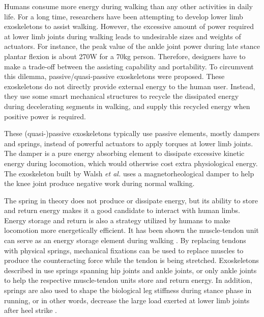 \documentclass[twocolumn,cleanfoot,10pt]{asme2ej}
\begin{document}
Humans consume more energy during walking than any other activities in daily life.
For a long time, researchers have been attempting to develop lower limb exoskeletons to assist walking.
However, the excessive amount of power required at lower limb joints during walking leads to undesirable sizes and weights of actuators\cite{RN1}.
For instance, the peak value of the ankle joint power during late stance plantar flexion is about 270W for a 70kg person\cite{RN2}.
Therefore, designers have to make a trade-off between the assisting capability and portability.
To circumvent this dilemma, passive/quasi-passive exoskeletons were proposed\cite{RN3}.
These exoskeletons do not directly provide external energy to the human user.
Instead, they use some smart mechanical structures to recycle the dissipated energy during decelerating segments in walking, and supply this recycled energy when positive power is required.

These (quasi-)passive exoskeletons typically use passive elements, mostly dampers and springs, instead of powerful actuators to apply torques at lower limb joints.
The damper is a pure energy absorbing element to dissipate excessive kinetic energy during locomotion, which would otherwise cost extra physiological energy\cite{negativework}.
The exoskeleton built by Walsh \emph{et al.} uses a magnetorheological damper to help the knee joint produce negative work during normal walking\cite{RN3}.

The spring in theory does not produce or dissipate energy, but its ability to store and return energy makes it a good candidate to interact with human limbs. 
Energy storage and return is also a strategy utilized by humans to make locomotion more energetically efficient.
It has been shown the muscle-tendon unit can serve as an energy storage element during walking \cite{RN16,pays}.
By replacing tendons with physical springs, mechanical fixations can be used to replace muscles to produce the counteracting force while the tendon is being stretched.
Exoskeletons described in \cite{RN3,RN4,RN5} use springs spanning hip joints and ankle joints, or only ankle joints to help the respective muscle-tendon units store and return energy.
In addition, springs are also used to shape the biological leg stiffness during stance phase in running, or in other words, decrease the large load exerted at lower limb joints after heel strike \cite{RN6,RN7,RN8}.
\end{document}
